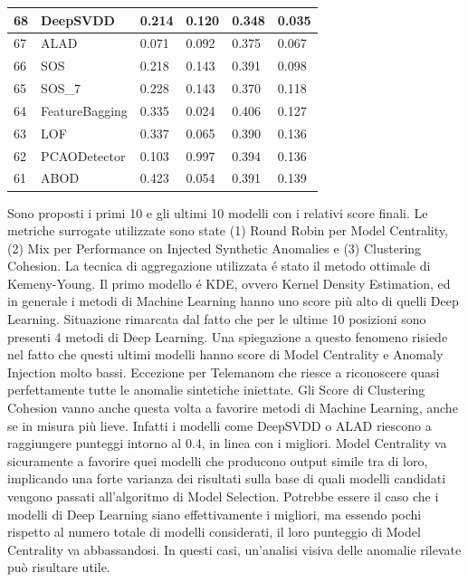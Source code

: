 \begin{table}[H]
\begin{minipage}{.5\textwidth}
{\begin{tabular}{|l|l|l|l|l|l|}
				\hline
				68          & DeepSVDD       & 0.214       & 0.120        & 0.348       & 0.035            \\ 
				\hline
				67          & ALAD           & 0.071       & 0.092        & 0.375       & 0.067            \\ 
				\hline
				66          & SOS            & 0.218       & 0.143        & 0.391       & 0.098            \\ 
				\hline
				65          & SOS\_7         & 0.228       & 0.143        & 0.370       & 0.118            \\ 
				\hline
				64          & FeatureBagging & 0.335       & 0.024        & 0.406       & 0.127            \\ 
				\hline
				63          & LOF            & 0.337       & 0.065        & 0.390       & 0.136            \\ 
				\hline
				62          & PCAODetector   & 0.103       & 0.997        & 0.394       & 0.136            \\ 
				\hline
				61          & ABOD           & 0.423       & 0.054        & 0.391       & 0.139            \\
				\hline
			\end{tabular}}
	\end{minipage}
\end{table}




Sono proposti i primi 10 e gli ultimi 10 modelli con i relativi score finali. Le metriche surrogate utilizzate sono state (1) Round Robin per Model Centrality, (2) Mix per Performance on Injected Synthetic Anomalies e (3) Clustering Cohesion. La tecnica di aggregazione utilizzata é stato il metodo ottimale di Kemeny-Young.
Il primo modello é KDE, ovvero Kernel Density Estimation, ed in generale i metodi di Machine Learning hanno uno score più alto di quelli Deep Learning. Situazione rimarcata dal fatto che per le ultime 10 posizioni sono presenti 4 metodi di Deep Learning. Una spiegazione a questo fenomeno risiede nel fatto che questi ultimi modelli hanno score di Model Centrality e Anomaly Injection molto bassi. Eccezione per Telemanom che riesce a riconoscere quasi perfettamente tutte le anomalie sintetiche iniettate. Gli Score di Clustering Cohesion vanno anche questa volta a favorire metodi di Machine Learning, anche se in misura più lieve. Infatti i modelli come DeepSVDD o ALAD riescono a  raggiungere punteggi intorno al 0.4, in linea con i migliori.
Model Centrality va sicuramente a favorire quei modelli che producono output simile tra di loro, implicando una forte varianza dei risultati sulla base di quali modelli candidati vengono passati all'algoritmo di Model Selection. Potrebbe essere il caso che i modelli di Deep Learning siano effettivamente i migliori, ma essendo pochi rispetto al numero totale di modelli considerati, il loro punteggio di Model Centrality va abbassandosi. In questi casi, un'analisi visiva delle anomalie rilevate può risultare utile.

